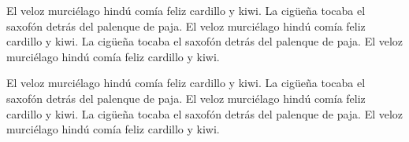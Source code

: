 El veloz murciélago hindú comía feliz cardillo y kiwi.  La cigüeña tocaba el saxofón detrás del palenque de paja.  El veloz murciélago hindú comía feliz cardillo y kiwi.  La cigüeña tocaba el saxofón detrás del palenque de paja.  El veloz murciélago hindú comía feliz cardillo y kiwi.

El veloz murciélago hindú comía feliz cardillo y kiwi.  La cigüeña tocaba el saxofón detrás del palenque de paja.  El veloz murciélago hindú comía feliz cardillo y kiwi.  La cigüeña tocaba el saxofón detrás del palenque de paja.  El veloz murciélago hindú comía feliz cardillo y kiwi.


\newpage
%
